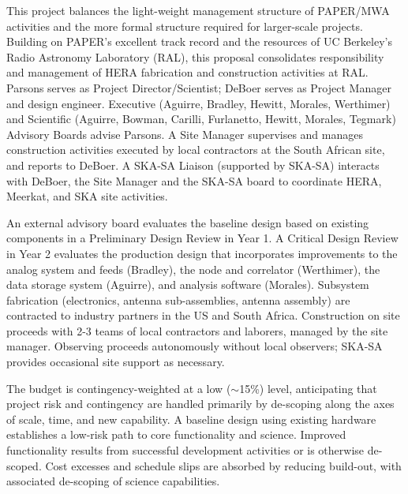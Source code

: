 \documentclass[preprint]{aastex}
\begin{document}
This project balances the light-weight
management structure of PAPER/MWA activities and the more formal structure
required for larger-scale projects.  Building on PAPER's excellent track record
and the resources of UC Berkeley's Radio Astronomy Laboratory (RAL),
this proposal consolidates responsibility and management of HERA
fabrication and construction activities at RAL. Parsons serves as
Project Director/Scientist; DeBoer serves as Project Manager and design engineer.
Executive
(Aguirre, Bradley, Hewitt, Morales, Werthimer)
and Scientific (Aguirre, Bowman, Carilli, Furlanetto, Hewitt, Morales, Tegmark) Advisory Boards advise Parsons.
A Site Manager supervises and manages
construction activities executed by local contractors at the South African
site, and reports to DeBoer.  A SKA-SA Liaison (supported by SKA-SA)
interacts with DeBoer, the Site Manager and the SKA-SA board to
coordinate HERA, Meerkat, and SKA site activities.

An external advisory board evaluates the baseline design
based on existing components in a Preliminary Design Review in Year 1.
A Critical Design Review in Year 2 evaluates the
production design that incorporates improvements to the analog system
and feeds (Bradley), the node and correlator (Werthimer), the data storage
system (Aguirre), and analysis software (Morales).
Subsystem fabrication (electronics, antenna sub-assemblies, antenna assembly)
are contracted to industry partners in the US and South Africa.   Construction on site proceeds
with 2-3 teams of local contractors and laborers, managed by the site manager.  Observing proceeds 
autonomously without local observers; SKA-SA
provides occasional site support as necessary.

The budget is contingency-weighted at a low ($\sim$15\%) level, anticipating that project 
risk and contingency are handled primarily by de-scoping along the axes of scale, time, and new capability.  
A baseline design using
existing hardware establishes a low-risk path to core functionality and science.  Improved functionality
results from successful development activities or is otherwise de-scoped.
Cost excesses and schedule slips are absorbed by reducing
build-out, with associated de-scoping of science capabilities.
\end{document}
